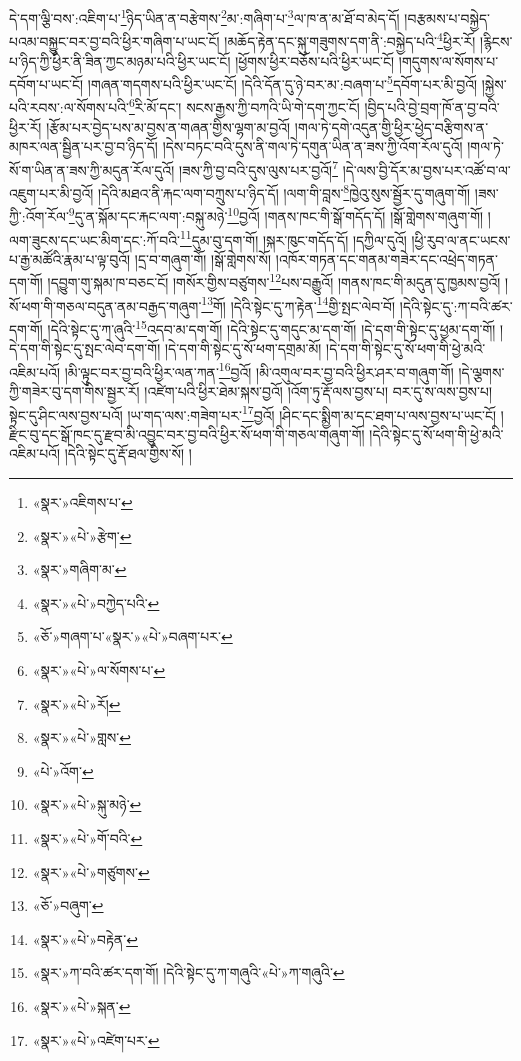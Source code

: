 དེ་དག་ལྕི་བས་:འཇིག་པ་\footnote{«སྣར་»འཇིགས་པ་}ཉིད་ཡིན་ན་བརྩེགས་\footnote{«སྣར་»«པེ་»རྩེག་}མ་:གཞིག་པ་\footnote{«སྣར་»གཞིག་མ་}ལ་ཁ་ན་མ་ཐོ་བ་མེད་དོ། །བརྩམས་པ་བསྐྱེད་པའམ་བསྐྱུང་བར་བྱ་བའི་ཕྱིར་གཞིག་པ་ཡང་ངོ། །མཆོད་རྟེན་དང་སྐུ་གཟུགས་དག་ནི་:བསྐྱེད་པའི་\footnote{«སྣར་»«པེ་»བཀྱེད་པའི་}ཕྱིར་རོ། །རྙིངས་པ་ཉིད་ཀྱི་ཕྱིར་ནི་ཟིན་ཀྱང་མཉམ་པའི་ཕྱིར་ཡང་ངོ། །ཕྱོགས་ཕྱིར་བཅོས་པའི་ཕྱིར་ཡང་ངོ། །གདུགས་ལ་སོགས་པ་དབོག་པ་ཡང་ངོ། །གཞན་གདགས་པའི་ཕྱིར་ཡང་ངོ། །དེའི་དོན་དུ་ཉེ་བར་མ་:བཞག་པ་\footnote{«ཅོ་»གཞག་པ་«སྣར་»«པེ་»བཞག་པར་}དབོག་པར་མི་བྱའོ། །སྐྱེས་པའི་རབས་:ལ་སོགས་པའི་\footnote{«སྣར་»«པེ་»ལ་སོགས་པ་}རི་མོ་དང་། སངས་རྒྱས་ཀྱི་བཀའི་ཡི་གེ་དག་ཀྱང་ངོ། །བྱིད་པའི་བྱེ་བྲག་ཁོ་ན་བྱ་བའི་ཕྱིར་རོ། །རྩོམ་པར་བྱེད་པས་མ་བྱས་ན་གཞན་གྱིས་ལྷག་མ་བྱའོ། །གལ་ཏེ་དགེ་འདུན་གྱི་ཕྱིར་ཕྱེད་བརྩིགས་ན་མཁར་ལན་སྦྱིན་པར་བྱ་བ་ཉིད་དོ། །དེས་བཏང་བའི་དུས་ནི་གལ་ཏེ་དགུན་ཡིན་ན་ཟས་ཀྱི་འོག་རོལ་དུའོ། །གལ་ཏེ་སོ་ག་ཡིན་ན་ཟས་ཀྱི་མདུན་རོལ་དུའོ། །ཟས་ཀྱི་བྱ་བའི་དུས་ལུས་པར་བྱའོ།\footnote{«སྣར་»«པེ་»རོ།} །དེ་ལས་བྱི་དོར་མ་བྱས་པར་འཚོ་བ་ལ་འཇུག་པར་མི་བྱའོ། །དེའི་མཐའ་ནི་རྐང་ལག་བཀྲུས་པ་ཉིད་དོ། །ལག་གི་བླས་\footnote{«སྣར་»«པེ་»གླས་}ཁྱེའུ་སུས་སྦྱོར་དུ་གཞུག་གོ། །ཟས་ཀྱི་:འོག་རོལ་\footnote{«པེ་»འོག་}དུ་ན་སྐོམ་དང་རྐང་ལག་:བསྐུ་མཉེ་\footnote{«སྣར་»«པེ་»སྐུ་མཉེ་}བྱའོ། །གནས་ཁང་གི་སྒོ་གདོད་དོ། །སྒོ་གླེགས་གཞུག་གོ། །ལག་ཟུངས་དང་ཡང་མིག་དང་:ཀོ་བའི་\footnote{«སྣར་»«པེ་»གོ་བའི་}དུམ་བུ་དག་གོ། །སྐར་ཁུང་གདོད་དོ། །དཀྱིལ་དུའོ། །ཕྱི་རུབ་ལ་ནང་ཡངས་པ་རྒྱ་མཚོའི་རྣམ་པ་ལྟ་བུའོ། །དྲ་བ་གཞུག་གོ། །སྒོ་གླེགས་སོ། །འཁོར་གཏན་དང་གནམ་གཟེར་དང་འཕྲེད་གཏན་དག་གོ། །དབྱུག་གུ་སྐམ་ཁ་བཅང་ངོ། །གསོར་གྱིས་བཙུགས་\footnote{«སྣར་»«པེ་»གཙུགས་}པས་བརྒྱུའོ། །གནས་ཁང་གི་མདུན་དུ་ཁྱམས་བྱའོ། །སོ་ཕག་གི་གཅལ་བདུན་ནམ་བརྒྱད་གཞུག་\footnote{«ཅོ་»བཞུག་}གོ། །དེའི་སྟེང་དུ་ཀ་རྟེན་\footnote{«སྣར་»«པེ་»བརྟེན་}གྱི་སྤང་ལེབ་བོ། །དེའི་སྟེང་དུ་:ཀ་བའི་ཚར་དག་གོ། །དེའི་སྟེང་དུ་ཀ་ཞུའི་\footnote{«སྣར་»ཀ་བའི་ཚར་དག་གོ། །དེའི་སྟེང་དུ་ཀ་གཞུའི་«པེ་»ཀ་གཞུའི་}འདབ་མ་དག་གོ། །དེའི་སྟེང་དུ་གདུང་མ་དག་གོ། །དེ་དག་གི་སྟེང་དུ་ཕྱམ་དག་གོ། །དེ་དག་གི་སྟེང་དུ་སྤང་ལེབ་དག་གོ། །དེ་དག་གི་སྟེང་དུ་སོ་ཕག་དགྲམ་མོ། །དེ་དག་གི་སྟེང་དུ་སོ་ཕག་གི་ཕྱེ་མའི་འཇིམ་པའོ། །མི་ལྟུང་བར་བྱ་བའི་ཕྱིར་ལན་ཀན་\footnote{«སྣར་»«པེ་»སྐན་}བྱའོ། །མི་འགུལ་བར་བྱ་བའི་ཕྱིར་ཤར་བ་གཞུག་གོ། །དེ་ལྕགས་ཀྱི་གཟེར་བུ་དག་གིས་སྦྱར་རོ། །འཛེག་པའི་ཕྱིར་ཐེམ་སྐས་བྱའོ། །འོག་ཏུ་རྡོ་ལས་བྱས་པ། བར་དུ་ས་ལས་བྱས་པ། སྟེང་དུ་ཤིང་ལས་བྱས་པའོ། །ཡ་གད་ལས་:གཟེག་པར་\footnote{«སྣར་»«པེ་»འཛེག་པར་}བྱའོ། །ཤིང་དང་སྨྱིག་མ་དང་ཐག་པ་ལས་བྱས་པ་ཡང་ངོ། །རྫིང་བུ་དང་སྒོ་ཁང་དུ་རྫབ་མི་འབྱུང་བར་བྱ་བའི་ཕྱིར་སོ་ཕག་གི་གཅལ་གཞུག་གོ། །དེའི་སྟེང་དུ་སོ་ཕག་གི་ཕྱེ་མའི་འཇིམ་པའོ། །དེའི་སྟེང་དུ་རྡོ་ཐལ་གྱིས་སོ། །
